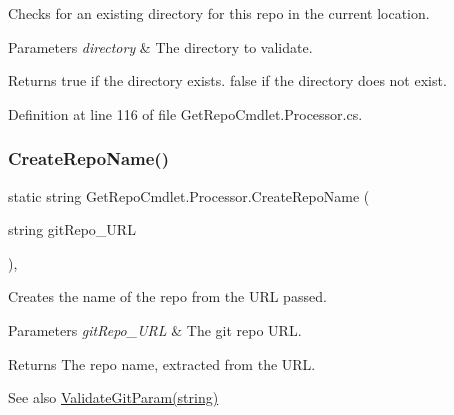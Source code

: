 Checks for an existing directory for this repo in the current location. 


\begin{DoxyParams}{Parameters}
{\em directory} & The directory to validate.\\
\hline
\end{DoxyParams}
\begin{DoxyReturn}{Returns}
{\ttfamily true} if the directory exists. {\ttfamily false} if the directory does not exist. 
\end{DoxyReturn}


Definition at line 116 of file Get\+Repo\+Cmdlet.\+Processor.\+cs.

\mbox{\label{class_get_repo_cmdlet_1_1_processor_a4a96e92b1c20e4f4fc38f9230d51912a}} 
\subsubsection{\texorpdfstring{Create\+Repo\+Name()}{CreateRepoName()}}
{\footnotesize\ttfamily static string Get\+Repo\+Cmdlet.\+Processor.\+Create\+Repo\+Name (\begin{DoxyParamCaption}\item[{string}]{git\+Repo\+\_\+\+U\+RL }\end{DoxyParamCaption})\hspace{0.3cm}{\ttfamily [static]}, {\ttfamily [package]}}



Creates the name of the repo from the U\+RL passed. 


\begin{DoxyParams}{Parameters}
{\em git\+Repo\+\_\+\+U\+RL} & The git repo U\+RL.\\
\hline
\end{DoxyParams}
\begin{DoxyReturn}{Returns}
The repo name, extracted from the U\+RL.
\end{DoxyReturn}
\begin{DoxySeeAlso}{See also}
\mbox{\hyperlink{class_get_repo_cmdlet_1_1_processor_a0fba012ba15720a0fcd419c44b757c5b}{Validate\+Git\+Param(string)}}


\end{DoxySeeAlso}


